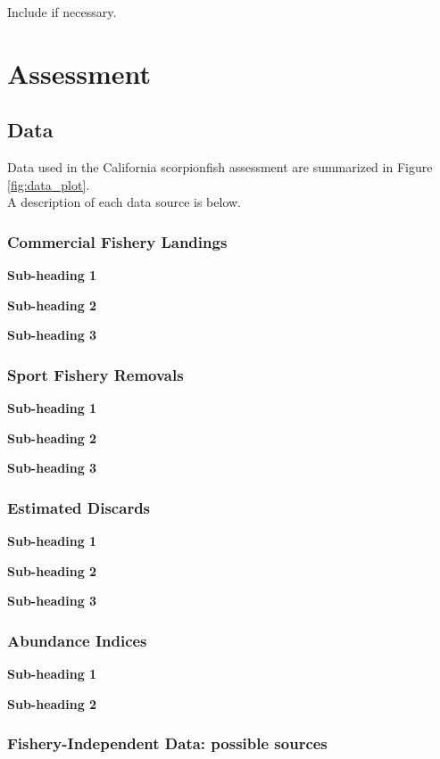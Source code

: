 \documentclass[12pt,]{article}
\begin{document}
Include if necessary.

\section{Assessment}\label{assessment}

\subsection{Data}\label{data}

Data used in the California scorpionfish assessment are summarized in
Figure \ref{fig:data_plot}.\\
A description of each data source is below.

\subsubsection{Commercial Fishery
Landings}\label{commercial-fishery-landings}

\textbf{Sub-heading 1}

\textbf{Sub-heading 2}

\textbf{Sub-heading 3}

\subsubsection{Sport Fishery Removals}\label{sport-fishery-removals}

\textbf{Sub-heading 1}

\textbf{Sub-heading 2}

\textbf{Sub-heading 3}

\subsubsection{Estimated Discards}\label{estimated-discards}

\textbf{Sub-heading 1}

\textbf{Sub-heading 2}

\textbf{Sub-heading 3}

\subsubsection{Abundance Indices}\label{abundance-indices}

\textbf{Sub-heading 1}

\textbf{Sub-heading 2}

\subsubsection{Fishery-Independent Data: possible
sources}\label{fishery-independent-data-possible-sources}
\end{document}
